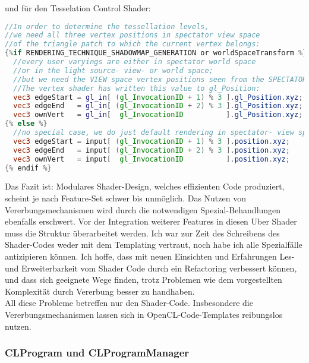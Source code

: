 	und für den Tesselation Control Shader:
	
	\begin{lstlisting}[language=GLSL]
//In order to determine the tessellation levels,
//we need all three vertex positions in spectator view space 
//of the triangle patch to which the current vertex belongs:
{%if RENDERING_TECHNIQUE_SHADOWMAP_GENERATION or worldSpaceTransform %}
  //every user varyings are either in spectator world space
  //or in the light source- view- or world space;
  //but we need the VIEW space vertex positions seen from the SPECTATOR camera for the tessellation level calculations!
  //The vertex shader has written this value to gl_Position:
  vec3 edgeStart = gl_in[ (gl_InvocationID + 1) % 3 ].gl_Position.xyz;
  vec3 edgeEnd   = gl_in[ (gl_InvocationID + 2) % 3 ].gl_Position.xyz;
  vec3 ownVert   = gl_in[  gl_InvocationID          ].gl_Position.xyz;
{% else %}
  //no special case, we do just default rendering in spectator- view space; So grab the default position value:
  vec3 edgeStart = input[ (gl_InvocationID + 1) % 3 ].position.xyz;
  vec3 edgeEnd   = input[ (gl_InvocationID + 2) % 3 ].position.xyz;
  vec3 ownVert   = input[  gl_InvocationID          ].position.xyz;  
{% endif %}  
	\end{lstlisting}
	
	
	Das Fazit ist: Modulares Shader-Design, welches effizienten Code produziert, scheint je nach Feature-Set
	schwer bis unmöglich. Das Nutzen von Vererbungsmechanismen wird durch die notwendigen Spezial-Behandlungen 
	ebenfalls erschwert.
	Vor der Integration weiterer Features in diesen Uber Shader muss die Struktur überarbeitet werden.
	Ich war zur Zeit des Schreibens des Shader-Codes weder mit dem Templating vertraut, noch habe ich alle Spezialfälle
	antizipieren können. Ich hoffe, dass mit neuen Einsichten und Erfahrungen Les- und Erweiterbarkeit
	vom Shader Code durch ein Refactoring verbessert können, und dass sich geeignete Wege finden, trotz Problemen wie dem
	vorgestellten Komplexität durch Vererbung besser zu handhaben.\\
	All diese Probleme betreffen nur den Shader-Code. Insbesondere die Vererbungsmechanismen
	lassen sich in OpenCL-Code-Templates reibungslos nutzen.


		
	\subsubsection{CLProgram und CLProgramManager}
	\label{sec:CLProgram}
	
